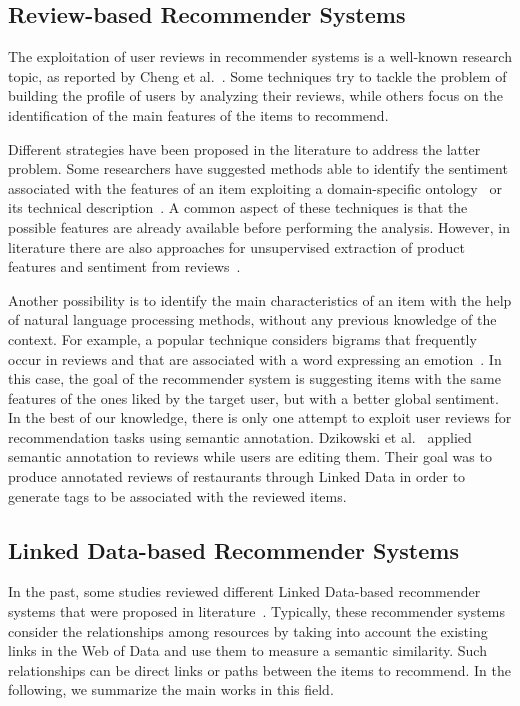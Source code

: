 \subsection{Review-based Recommender Systems}
\label{soa:sec:review-rs}

The exploitation of user reviews in recommender systems is a well-known research topic, as reported by Cheng et al.~\cite{Chen2015}. Some techniques try to tackle the problem of building the profile of users by analyzing their reviews, while others focus on the identification of the main features of the items to recommend.

Different strategies have been proposed in the literature to address the latter problem. Some researchers have suggested methods able to identify the sentiment associated with the features of an item exploiting a domain-specific ontology~\cite{Aciar2007} or its technical description~\cite{Yates2008}. A common aspect of these techniques is that the possible features are already available before performing the analysis. However, in literature there are also approaches for unsupervised extraction of product features and sentiment from reviews~\cite{Qiu2011, Somprasertsri2010}.

Another possibility is to identify the main characteristics of an item with the help of natural language processing methods, without any previous knowledge of the context. For example, a popular technique considers bigrams that frequently occur in reviews and that are associated with a word expressing an emotion~\cite{Dong2013}. In this case, the goal of the recommender system is suggesting items with the same features of the ones liked by the target user, but with a better global sentiment. In the best of our knowledge, there is only one attempt to exploit user reviews for recommendation tasks using semantic annotation. Dzikowski et al.~\cite{Dzikowski2012} applied semantic annotation to reviews while users are editing them. Their goal was to produce annotated reviews of restaurants through Linked Data in order to generate tags to be associated with the reviewed items.

\subsection{Linked Data-based Recommender Systems}
\label{soa:sec:linked-data}

In the past, some studies reviewed different Linked Data-based recommender systems that were proposed in literature~\cite{DiNoia2015, Figueroa2015}. Typically, these recommender systems consider the relationships among resources by taking into account the existing links in the Web of Data and use them to measure a semantic similarity. Such relationships can be direct links or paths between the items to recommend. In the following, we summarize the main works in this field. 

